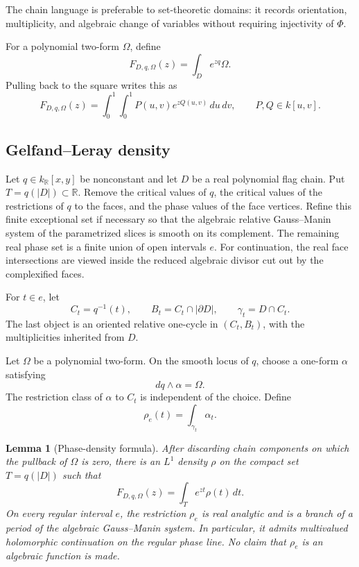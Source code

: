 \documentclass[11pt]{article}
\numberwithin{equation}{section}
\newtheorem{lemma}[lemma]{Lemma}
\theoremstyle{definition}
\theoremstyle{remark}
\newcommand{\R}{\mathbb R}
\begin{document}
The chain language is preferable to set-theoretic domains: it records
orientation, multiplicity, and algebraic change of variables without
requiring injectivity of $\Phi$.

For a polynomial two-form $\Omega$, define
\[
  F_{D,q,\Omega}(z)=\int_D e^{zq}\Omega.
\]
Pulling back to the square writes this as
\begin{equation}\label{eq:square-form}
  F_{D,q,\Omega}(z)
  =\int_0^1\int_0^1P(u,v)e^{zQ(u,v)}\,du\,dv,
  \qquad P,Q\in k[u,v].
\end{equation}

\subsection{Gelfand--Leray density}

Let $q\in k_{\R}[x,y]$ be nonconstant and let $D$ be a real polynomial flag chain.  Put
$T=q(|D|)\subset\R$.  Remove the critical values of $q$, the critical values
of the restrictions of $q$ to the faces, and the phase values of the face
vertices.  Refine this finite exceptional set if necessary so that the algebraic
relative Gauss--Manin system of the parametrized slices is smooth on its
complement. The remaining real phase set is a finite union of open
intervals $e$. For continuation, the real face intersections are viewed
inside the reduced algebraic divisor cut out by the complexified faces.

For $t\in e$, let
\[
  C_t=q^{-1}(t),
  \qquad
  B_t=C_t\cap|\partial D|,
  \qquad
  \gamma_t=D\cap C_t.
\]
The last object is an oriented relative one-cycle in $(C_t,B_t)$, with the
multiplicities inherited from $D$.

Let $\Omega$ be a polynomial two-form.  On the smooth locus of $q$, choose a
one-form $\alpha$ satisfying
\begin{equation}\label{eq:GL}
  dq\wedge\alpha=\Omega.
\end{equation}
The restriction class of $\alpha$ to $C_t$ is independent of the choice.
Define
\begin{equation}\label{eq:density}
  \rho_e(t)=\int_{\gamma_t}\alpha_t.
\end{equation}

\begin{lemma}[Phase-density formula]\label{lem:density-formula}
After discarding chain components on which the pullback of $\Omega$ is zero,
there is an $L^1$ density $\rho$ on the compact set $T=q(|D|)$ such that
\begin{equation}\label{eq:laplace-density}
  F_{D,q,\Omega}(z)=\int_T e^{zt}\rho(t)\,dt.
\end{equation}
On every regular interval $e$, the restriction $\rho_e$ is real analytic and
is a branch of a period of the algebraic Gauss--Manin system.  In particular,
it admits multivalued holomorphic continuation on the regular phase line.  No
claim that $\rho_e$ is an algebraic function is made.
\end{lemma}
\end{document}
